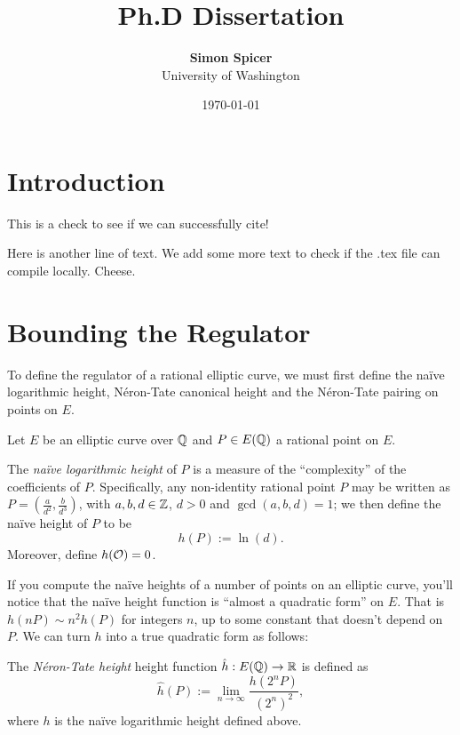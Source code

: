 \documentclass[10pt]{article}
\title{Ph.D Dissertation}
\author{{\bf Simon Spicer} \\ University of Washington}
\date{\today}
\begin{document}
\maketitle

\section{Introduction}

This is a check to see if we can successfully cite! \cite{Bob-2011}

Here is another line of text. We add some more text to check if the .tex file can compile locally. Cheese.

\section{Bounding the Regulator}

To define the regulator of a rational elliptic curve, we must first define the na\"ive logarithmic height, N\'eron-Tate canonical height and the N\'eron-Tate pairing on points on $E$.

Let $E$ be an elliptic curve over $\mathbb{Q}$ and $P \in E(\mathbb{Q})$ a rational point on $E$. 

\begin{definition}
The {\it na\"ive logarithmic height} of $P$ is a measure of the ``complexity'' of the coefficients of $P$. Specifically, any non-identity rational point $P$ may be written as $P = (\frac{a}{d^2},\frac{b}{d^3})$, with $a,b,d \in \mathbb{Z}$, $d>0$ and $\gcd(a,b,d) = 1$; we then define the na\"ive height of $P$ to be
\begin{equation}
	h(P) := \ln(d).
\end{equation}
Moreover, define $h(\mathcal{O}) = 0$.
\end{definition}
If you compute the na\"ive heights of a number of points on an elliptic curve, you'll notice that the na\"ive height function is ``almost a quadratic form'' on $E$. That is $h(nP) \sim n^2 h(P)$ for integers $n$, up to some constant that doesn't depend on $P$. We can turn $h$ into a true quadratic form as follows:

\begin{definition}
The {\it N\'eron-Tate height} height function $\hat{h}: E(\mathbb{Q}) \to \mathbb{R}$ is defined as
\begin{equation}
	\hat{h}(P) := \lim_{n \to \infty} \frac{h(2^n P)}{(2^n)^2},
\end{equation}
where $h$ is the na\"ive logarithmic height defined above.
\end{definition}
\end{document}
